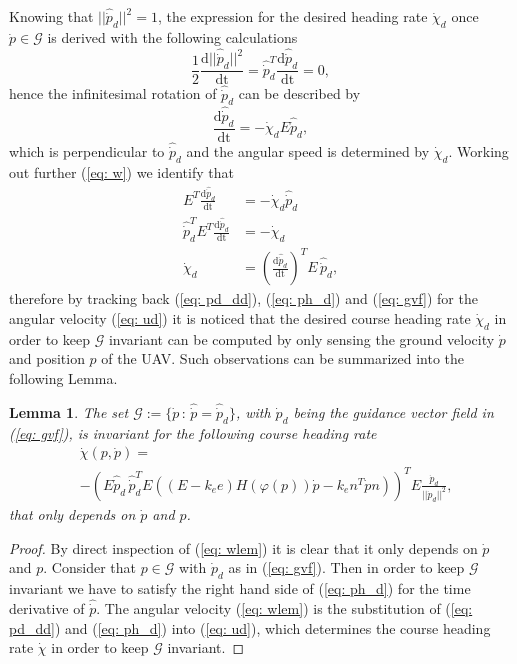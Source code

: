 \documentclass[letterpaper, 10 pt, conference]{ieeeconf}  %
\newtheorem{lemma}[theorem]{\textbf{Lemma}}
\begin{document}
Knowing that $||\hat {\dot p}_d||^2=1$, the expression for the desired heading rate $\dot\chi_d$ once $\dot p \in\mathcal{G}$ is derived with the following calculations
\begin{equation}
	\frac{1}{2}\frac{\mathrm{d}||\hat {\dot p}_d||^2}{\mathrm{dt}} = \hat {\dot p}_d^T \frac{\mathrm{d}\hat{\dot p}_d}{\mathrm{dt}} = 0,
\end{equation}
hence the infinitesimal rotation of $\hat{\dot p}_d$ can be described by
\begin{equation}
	\frac{\mathrm{d}\hat {\dot p}_d}{\mathrm{dt}} = -\dot\chi_d E\hat{\dot p}_d,
	\label{eq: w}
\end{equation}
which is perpendicular to $\hat {\dot p}_d$ and the angular speed is determined by $\dot\chi_d$. Working out further (\ref{eq: w}) we identify that
\begin{align}
	E^T \frac{\mathrm{d}\hat {\dot p}_d}{\mathrm{dt}} &= -\dot\chi_d \hat {\dot p}_d \nonumber \\
	\hat {\dot p}_d^T E^T \frac{\mathrm{d}\hat{\dot p}_d}{\mathrm{dt}} &= -\dot\chi_d \nonumber \\
	\dot\chi_d &= \left(\frac{\mathrm{d}\hat {\dot p}_d}{\mathrm{dt}}\right)^T E \,\hat{\dot p}_d,
	\label{eq: ud}
\end{align}
therefore by tracking back (\ref{eq: pd_dd}), (\ref{eq: ph_d}) and (\ref{eq: gvf}) for the angular velocity (\ref{eq: ud}) it is noticed that the desired course heading rate $\dot\chi_d$ in order to keep $\mathcal{G}$ invariant can be computed by only sensing the ground velocity $\dot p$ and position $p$ of the UAV. Such observations can be summarized into the following Lemma.
\begin{lemma}
	\label{lem: 1}
	The set ${\mathcal{G}} :=  \{\dot p \, : \, \hat{\dot p} = \hat{\dot p}_d\}$, with $\dot p_d$ being the guidance vector field in (\ref{eq: gvf}), is invariant for the following course heading rate
\begin{align}
	&\dot\chi(p,\dot p) = \nonumber \\
	&-\left(E\hat{\dot p}_d \, \hat{\dot p}_d^T E \left(\left(E -k_ee\right)H(\varphi(p))\dot p - k_en^T\dot p n\right)\right)^T  E\frac{\dot p_d}{||\dot p_d||^2}, \label{eq: wlem}
\end{align}
that only depends on $\dot p$ and $p$.
\end{lemma}
\begin{proof}
	By direct inspection of (\ref{eq: wlem}) it is clear that it only depends on $\dot p$ and $p$. Consider that $p\in\mathcal{G}$ with $\dot p_d$ as in (\ref{eq: gvf}). Then in order to keep $\mathcal{G}$ invariant we have to satisfy the right hand side of (\ref{eq: ph_d}) for the time derivative of $\hat{\dot p}$. The angular velocity (\ref{eq: wlem}) is the substitution of (\ref{eq: pd_dd}) and (\ref{eq: ph_d}) into (\ref{eq: ud}), which determines the course heading rate $\dot\chi$ in order to keep $\mathcal{G}$ invariant.
\end{proof}
\end{document}
